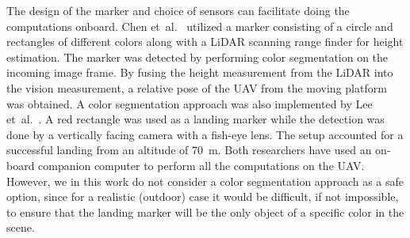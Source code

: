 \documentclass[conference, onecolumn, draftclsnofoot]{IEEEtran}
\begin{document}





The design of the marker and choice of sensors can facilitate doing the computations onboard. %
%
Chen et~al.~\cite{chen2016system} utilized a marker consisting of a
circle and rectangles of different colors along with a LiDAR scanning
range finder for height estimation. The marker was detected by
performing color segmentation on the incoming image frame. By fusing
the height measurement from the LiDAR into the vision measurement, a
relative pose of the UAV from the moving platform was obtained. A
color segmentation approach was also implemented by Lee
et~al.~\cite{lee2016vision}. A red rectangle was used as a landing marker while the detection was done by a vertically facing camera with a fish-eye lens. The setup accounted for a successful landing from an altitude of \SI{70}{\m}. Both researchers have used an on-board companion computer to
perform all the computations on the UAV. However, we in this work do not consider a color segmentation
approach as a safe option, since for a realistic (outdoor)
case it would be difficult, if not impossible, to ensure that the
landing marker will be the only object of a specific color in the
scene.
\end{document}
